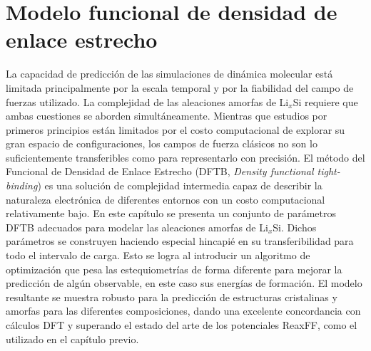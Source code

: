 \chapter{Modelo funcional de densidad de enlace estrecho}\label{ch:modelo}
\thispagestyle{empty}

\vspace{50pt}

\begin{adjustwidth}{50pt}{50pt}
    La capacidad de predicción de las simulaciones de dinámica molecular está 
    limitada principalmente por la escala temporal y por la fiabilidad del campo
    de fuerzas utilizado. La complejidad de las aleaciones amorfas de Li$_x$Si 
    requiere que ambas cuestiones se aborden simultáneamente. Mientras que 
    estudios por primeros principios están limitados por el costo computacional
    de explorar su gran espacio de configuraciones, los campos de fuerza clásicos
    no son lo suficientemente transferibles como para representarlo con precisión.
    El método del Funcional de Densidad de Enlace Estrecho (DFTB, \textit{Density
    functional tight-binding}) es una solución de complejidad intermedia capaz
    de describir la naturaleza electrónica de diferentes entornos con un costo
    computacional relativamente bajo. En este capítulo se presenta un conjunto
    de parámetros DFTB adecuados para modelar las aleaciones amorfas de Li$_x$Si.
    Dichos parámetros se construyen haciendo especial hincapié en su 
    transferibilidad para todo el intervalo de carga. Esto se
    logra al introducir un algoritmo de optimización que pesa las estequiometrías
    de forma diferente para mejorar la predicción de algún observable, en este 
    caso sus energías de formación.
    El modelo resultante se muestra robusto para la predicción de estructuras
    cristalinas y amorfas para las diferentes composiciones, dando una excelente
    concordancia con cálculos DFT y superando el estado del arte de los 
    potenciales ReaxFF, como el utilizado en el capítulo previo.
\end{adjustwidth}

\clearpage
\newpage
\thispagestyle{empty}
\mbox{}
\newpage








